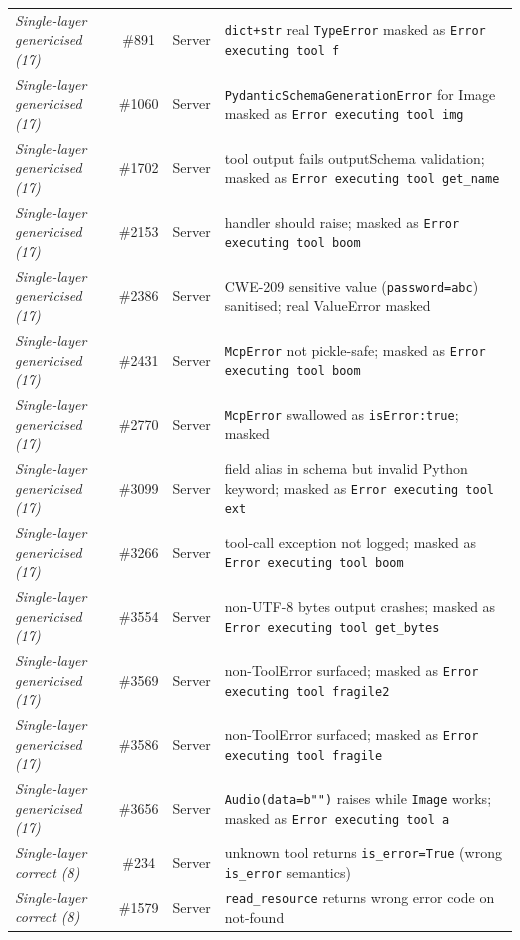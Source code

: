 \begin{table}[!t]
\begin{tabularx}{\textwidth}{@{}>{\centering\arraybackslash}X{} >{\centering\arraybackslash}c >{\centering\arraybackslash}c >{\arraybackslash}X{}@{}}
\emph{Single-layer genericised (17)} & \#891 & Server & \texttt{dict+str} real \texttt{TypeError} masked as \texttt{Error executing tool f} \\
\emph{Single-layer genericised (17)} & \#1060 & Server & \texttt{PydanticSchemaGenerationError} for Image masked as \texttt{Error executing tool img} \\
\emph{Single-layer genericised (17)} & \#1702 & Server & tool output fails outputSchema validation; masked as \texttt{Error executing tool get\_name} \\
\emph{Single-layer genericised (17)} & \#2153 & Server & handler should raise; masked as \texttt{Error executing tool boom} \\
\emph{Single-layer genericised (17)} & \#2386 & Server & CWE-209 sensitive value (\texttt{password=abc}) sanitised; real ValueError masked \\
\emph{Single-layer genericised (17)} & \#2431 & Server & \texttt{McpError} not pickle-safe; masked as \texttt{Error executing tool boom} \\
\emph{Single-layer genericised (17)} & \#2770 & Server & \texttt{McpError} swallowed as \texttt{isError:true}; masked \\
\emph{Single-layer genericised (17)} & \#3099 & Server & field alias in schema but invalid Python keyword; masked as \texttt{Error executing tool ext} \\
\emph{Single-layer genericised (17)} & \#3266 & Server & tool-call exception not logged; masked as \texttt{Error executing tool boom} \\
\emph{Single-layer genericised (17)} & \#3554 & Server & non-UTF-8 bytes output crashes; masked as \texttt{Error executing tool get\_bytes} \\
\emph{Single-layer genericised (17)} & \#3569 & Server & non-ToolError surfaced; masked as \texttt{Error executing tool fragile2} \\
\emph{Single-layer genericised (17)} & \#3586 & Server & non-ToolError surfaced; masked as \texttt{Error executing tool fragile} \\
\emph{Single-layer genericised (17)} & \#3656 & Server & \texttt{Audio(data=b"")} raises while \texttt{Image} works; masked as \texttt{Error executing tool a} \\
\midrule
\emph{Single-layer correct (8)} & \#234 & Server & unknown tool returns \texttt{is\_error=True} (wrong \texttt{is\_error} semantics) \\
\emph{Single-layer correct (8)} & \#1579 & Server & \texttt{read\_resource} returns wrong error code on not-found \\

\end{tabularx}
\end{table}
